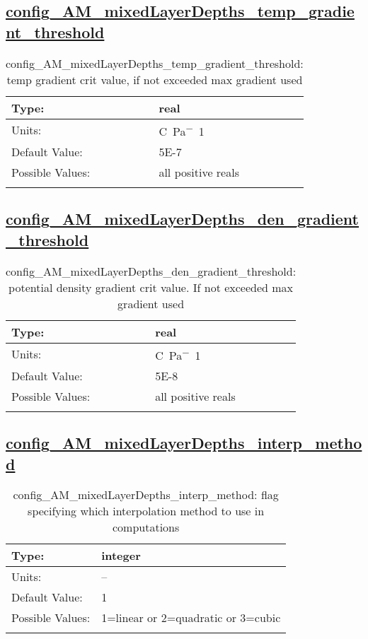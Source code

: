 \subsection[config\_AM\_mixedLayerDepths\_temp\_gradient\_threshold]{\hyperref[sec:nm_tab_AM_mixedLayerDepths]{config\_AM\_mixedLayerDepths\_temp\_gradient\_threshold}}
\label{subsec:nm_sec_config_AM_mixedLayerDepths_temp_gradient_threshold}
\begin{center}
\begin{longtable}{| p{2.0in} || p{4.0in} |}
    \hline
    Type: & real \\
    \hline
    Units: & \si{C.Pa^-1} \\
    \hline
    Default Value: & 5E-7 \\
    \hline
    Possible Values: & all positive reals \\
    \hline
    \caption{config\_AM\_mixedLayerDepths\_temp\_gradient\_threshold: temp gradient crit value, if not exceeded max gradient used}
\end{longtable}
\end{center}
\subsection[config\_AM\_mixedLayerDepths\_den\_gradient\_threshold]{\hyperref[sec:nm_tab_AM_mixedLayerDepths]{config\_AM\_mixedLayerDepths\_den\_gradient\_threshold}}
\label{subsec:nm_sec_config_AM_mixedLayerDepths_den_gradient_threshold}
\begin{center}
\begin{longtable}{| p{2.0in} || p{4.0in} |}
    \hline
    Type: & real \\
    \hline
    Units: & \si{C.Pa^-1} \\
    \hline
    Default Value: & 5E-8 \\
    \hline
    Possible Values: & all positive reals \\
    \hline
    \caption{config\_AM\_mixedLayerDepths\_den\_gradient\_threshold: potential density gradient crit value.  If not exceeded max gradient used}
\end{longtable}
\end{center}
\subsection[config\_AM\_mixedLayerDepths\_interp\_method]{\hyperref[sec:nm_tab_AM_mixedLayerDepths]{config\_AM\_mixedLayerDepths\_interp\_method}}
\label{subsec:nm_sec_config_AM_mixedLayerDepths_interp_method}
\begin{center}
\begin{longtable}{| p{2.0in} || p{4.0in} |}
    \hline
    Type: & integer \\
    \hline
    Units: & -- \\
    \hline
    Default Value: & 1 \\
    \hline
    Possible Values: & 1=linear or 2=quadratic or 3=cubic \\
    \hline
    \caption{config\_AM\_mixedLayerDepths\_interp\_method: flag specifying which interpolation method to use in computations}
\end{longtable}
\end{center}
